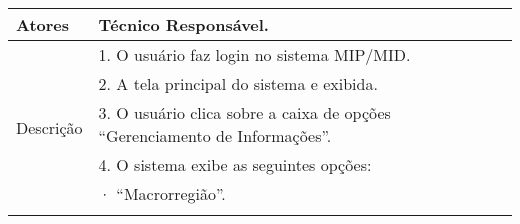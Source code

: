 \begin{table}[!h]
\begin{tabular}{|l|l|}
Atores                                                   & Técnico Responsável.                                                                                                                                                                                                                                                                                                                                                                     \\ \hline
\multirow{11}{*}{Descrição}                              & 1. O usuário faz login no sistema MIP/MID.                                                                                                                                                                                                                                                                                                                                               \\ \cline{2-2} 
                                                         & 2. A tela principal do sistema e exibida.                                                                                                                                                                                                                                                                                                                                                \\ \cline{2-2} 
                                                         & 3. O usuário clica sobre a caixa de opções “Gerenciamento de Informações”.                                                                                                                                                                                                                                                                                                               \\ \cline{2-2} 
                                                         & 4. O sistema exibe as seguintes opções:                                                                                                                                                                                                                                                                                                                                                  \\ \cline{2-2} 
                                                         & ·         “Macrorregião”.                                                                                                                                                                                                                                                                                                                                                                \\ \cline{2-2} 

\end{tabular}
\end{table}

